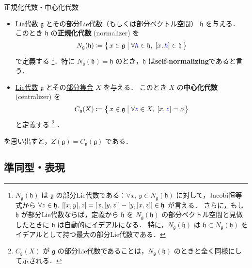 \documentclass[rep_main]{subfiles}
\begin{document}
\begin{mydef}[label=def:normalizer-LieAlg]{正規化代数・中心化代数}
    \begin{itemize}
        \item \hyperref[ax:LieAlg]{Lie代数} $\mathfrak{g}$ とその\hyperref[def:subLieAlg]{部分Lie代数}（もしくは部分ベクトル空間） $\mathfrak{h}$ を与える．
        このとき $\mathfrak{h}$ の\textbf{正規化代数} (normalizer) を
        \begin{align}
            N_{\mathfrak{g}} (\mathfrak{h}) \coloneqq \bigl\{\, x \in \mathfrak{g} \bigm| \forall \textcolor{blue}{h} \in \mathfrak{h},\; \comm{x}{\textcolor{blue}{h}} \in \mathfrak{h} \,\bigr\} 
        \end{align}
        で定義する
        \footnote{
            $N_{\mathfrak{g}} (\mathfrak{h})$ は $\mathfrak{g}$ の部分Lie代数である：$\forall x,\, y \in N_{\mathfrak{g}}(\mathfrak{h})$ に対して，Jacobi恒等式から $\forall z \in \mathfrak{h},\; \comm{\comm{x}{y}}{z} = \comm{x}{\comm{y}{z}} - \comm{y}{\comm{x}{z}} \in \mathfrak{h}$ が言える．
            さらに，もし $\mathfrak{h}$ が部分Lie代数ならば，定義から $\mathfrak{h}$ を $N_{\mathfrak{g}} (\mathfrak{h})$ の部分ベクトル空間と見做したときに $\mathfrak{h}$ は自動的に\hyperref[def:ideal-LieAlg]{イデアル}になる．
            特に，$N_{\mathfrak{g}} (\mathfrak{h})$ は $\mathfrak{h} \subset N_{\mathfrak{g}} (\mathfrak{h})$ をイデアルとして持つ最大の部分Lie代数である．
        }．特に $N_{\mathfrak{g}} (\mathfrak{h})  = \mathfrak{h}$ のとき，$\mathfrak{h}$ は\textbf{self-normalizing}であると言う．
        \item \hyperref[ax:LieAlg]{Lie代数} $\mathfrak{g}$ とその\underline{部分集合} $X$ を与える．
        このとき $X$ の\textbf{中心化代数} (centralizer) を
        \begin{align}
            C_{\mathfrak{g}} (X) \coloneqq \bigl\{\, x \in \mathfrak{g} \bigm| \forall \textcolor{blue}{z} \in X,\; \comm{x}{\textcolor{blue}{z}} = o \,\bigr\} 
        \end{align}
        と定義する
        \footnote{
            $C_{\mathfrak{g}} (X)$ が $\mathfrak{g}$ の部分Lie代数であることは，$N_{\mathfrak{g}} (\mathfrak{h})$ のときと全く同様にして示される．
        }
        ．
    \end{itemize}
\end{mydef}

を思い出すと，$Z (\mathfrak{g}) = C_{\mathfrak{g}} (\mathfrak{g})$ である．

\subsection{準同型・表現}
\end{document}
